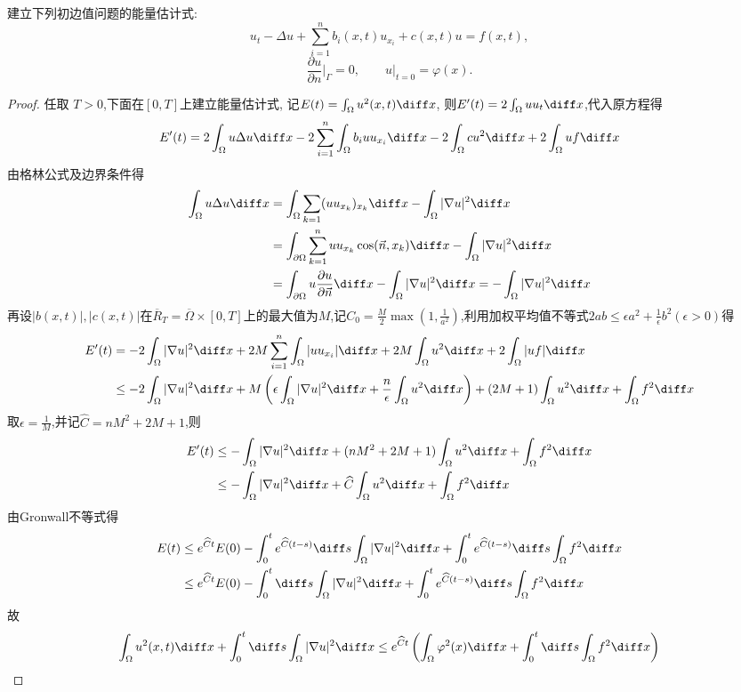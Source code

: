 \begin{exercise}
  建立下列初边值问题的能量估计式:
  \[u_t - \Delta u + \sum_{i=1}^n b_i(x,t) u_{x_i} + c(x,t)u = f(x,t),\]
  \[\frac{\partial u}{\partial n}\bigg|_{\varGamma} = 0,
    \qquad u|_{t=0} = \varphi(x).\]
\end{exercise}

\begin{proof}
  任取 $T>0$,下面在$[0,T]$上建立能量估计式, 记$E(t)=\int_{\Omega}u^2(x,t)\diff x$,
  则$E'(t)=2\int_{\Omega}uu_t\diff x$,代入原方程得
  \[E'(t)=2\int_{\Omega}u\Delta u\diff x-2\sum_{i=1}^n\int_{\Omega}b_iuu_{x_i}\diff x-2\int_{\Omega}cu^2\diff x+2\int_{\Omega}uf\diff x\]
  由格林公式及边界条件得
  \[\begin{split}
  \int_{\Omega}u\Delta u\diff x&=\int_{\Omega}\sum_{k=1}(uu_{x_k})_{x_k}\diff x-\int_{\Omega}|\nabla u|^2\diff x\\
  &=\int_{\partial\Omega}\sum_{k=1}^nuu_{x_k}\cos(\vec{n},x_k)\diff x-\int_{\Omega}|\nabla u|^2\diff x\\
  &=\int_{\partial\Omega}u\frac{\partial u}{\partial\vec{n}}\diff x-\int_{\Omega}|\nabla u|^2\diff x=-\int_{\Omega}|\nabla u|^2\diff x
  \end{split}\]
  再设$|b(x,t)|,|c(x,t)|$在$\overline{R}_T=\overline{\Omega}\times[0,T]$上的最大值为$M$,记$C_0=\frac{M}{2}\max(1,\frac{1}{a^2})$,利用加权平均值不等式$2ab\leq\epsilon a^2+\frac{1}{\epsilon}b^2(\epsilon>0)$得
  \[\begin{split}
  E'(t)&=-2\int_{\Omega}|\nabla u|^2\diff x+2M\sum_{i=1}^n\int_{\Omega}|uu_{x_i}|\diff x+2M\int_{\Omega}u^2\diff x+2\int_{\Omega}|uf|\diff x\\
  &\leq-2\int_{\Omega}|\nabla u|^2\diff x+M\left(\epsilon\int_{\Omega}|\nabla u|^2\diff x+\frac{n}{\epsilon}\int_{\Omega}u^2\diff x\right)+(2M+1)\int_{\Omega}u^2\diff x+\int_{\Omega}f^2\diff x
  \end{split}\]
  取$\epsilon=\frac{1}{M}$,并记$\widehat{C}=nM^2+2M+1$,则
  \[\begin{split}
  E'(t)&\leq-\int_{\Omega}|\nabla u|^2\diff x+(nM^2+2M+1)\int_{\Omega}u^2\diff x+\int_{\Omega}f^2\diff x\\
  &\leq-\int_{\Omega}|\nabla u|^2\diff x+\widehat{C}\int_{\Omega}u^2\diff x+\int_{\Omega}f^2\diff x
  \end{split}\]
  由Gronwall不等式得
  \[\begin{split}
  E(t)&\leq e^{\widehat{C}t}E(0)-\int_0^te^{\widehat{C}(t-s)}\diff s\int_{\Omega}|\nabla u|^2\diff x+\int_0^te^{\widehat{C}(t-s)}\diff s\int_{\Omega}f^2\diff x\\
  &\leq e^{\widehat{C}t}E(0)-\int_0^t\diff s\int_{\Omega}|\nabla u|^2\diff x+\int_0^te^{\widehat{C}(t-s)}\diff s\int_{\Omega}f^2\diff x
  \end{split}\]
  故
  \[\int_{\Omega}u^2(x,t)\diff x+\int_0^t\diff s\int_{\Omega}|\nabla u|^2\diff x\leq e^{\widehat{C}t}\left(\int_{\Omega}\varphi^2(x)\diff x+\int_0^t\diff s\int_{\Omega}f^2\diff x\right)\]
\end{proof}


